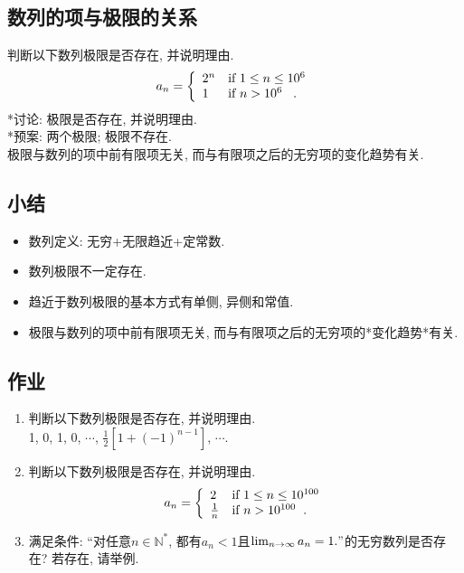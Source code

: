 \documentclass{article}
\begin{document}
\begin{CJK}{UTF8}{gkai}
\subsection{数列的项与极限的关系}
判断以下数列极限是否存在, 并说明理由.\\
\begin{displaymath}
a_n = \left\{ \begin{array}{ll}
 2^n & \textrm{if $1 \le n \le 10^6$}\\
 1 & \textrm{if $n > 10^6$}\hspace{3mm}.\\
  \end{array} \right.
\end{displaymath}
*讨论: 极限是否存在, 并说明理由.\\
*预案: 两个极限; 极限不存在.\\
极限与数列的项中前有限项无关, 而与有限项之后的无穷项的变化趋势有关.\\

\subsection{小结}
\begin{itemize}
\item 数列定义: 无穷+无限趋近+定常数.
\item 数列极限不一定存在.
\item 趋近于数列极限的基本方式有单侧, 异侧和常值.
\item 极限与数列的项中前有限项无关, 而与有限项之后的无穷项的*变化趋势*有关.
\end{itemize}

\subsection{作业}
\begin{enumerate}
\item 判断以下数列极限是否存在, 并说明理由.\\1, 0, 1, 0, $\cdots$, $\frac{1}{2}[1+(-1)^{n-1}]$, $\cdots.$
\item 判断以下数列极限是否存在, 并说明理由.\\
\begin{displaymath}
a_n = \left\{ \begin{array}{ll}
 2 & \textrm{if $1 \le n \le 10^{100}$}\\
 \frac{1}{n} & \textrm{if $n > 10^{100}$}\hspace{2mm}.\\
  \end{array} \right.
\end{displaymath} 
\item 满足条件: ``对任意$n \in \mathbb{N}^*$, 都有$a_n < 1$且$ \lim_{n \to \infty}{a_n} = 1."$的无穷数列是否存在? 若存在, 请举例.
\end{enumerate}

\end{CJK}
\end{document}

